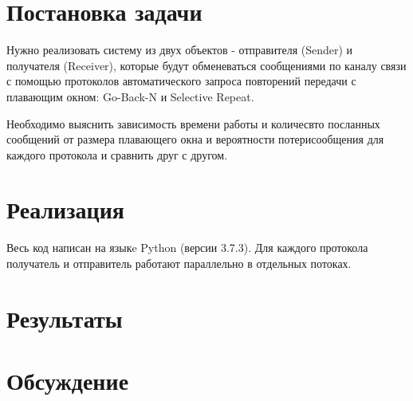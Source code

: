 \documentclass[a4paper,12pt]{article}
\begin{document}
    
    \newpage

    \tableofcontents
    \newpage

    \section{Постановка задачи}

    \quad Нужно реализовать систему из двух объектов - отправителя (Sender) и получателя (Receiver),
    которые будут обменеваться сообщениями по каналу связи с помощью протоколов автоматического запроса повторений передачи
    с плавающим окном: Go-Back-N и Selective Repeat.

    Необходимо выяснить зависимость времени работы и количесвто посланных сообщений от размера плавающего окна 
    и вероятности потерисообщения для каждого протокола и сравнить друг с другом.

    \section{Реализация}

    \quad Весь код написан на языкe Python (версии 3.7.3).
    Для каждого протокола получатель и отправитель работают параллельно в отдельных потоках.
    

    \section{Результаты}

    \section{Обсуждение}
\end{document}
